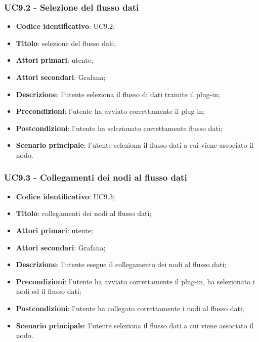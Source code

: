 \subsubsection{UC9.2 - Selezione del flusso dati}
\begin{itemize}
	\item \textbf{Codice identificativo}: UC9.2;
	\item \textbf{Titolo}: selezione del flusso dati;
	\item \textbf{Attori primari}: utente;
	\item \textbf{Attori secondari}: Grafana\glo;
	\item \textbf{Descrizione}: l'utente seleziona il flusso di dati tramite il plug-in;
	\item \textbf{Precondizioni}: l'utente ha avviato correttamente il plug-in;
	\item \textbf{Postcondizioni}: l'utente ha selezionato correttamente flusso dati;
	\item \textbf{Scenario principale}: l'utente seleziona il flusso dati a cui viene associato il nodo.
\end{itemize}

\subsubsection{UC9.3 - Collegamenti dei nodi al flusso dati}
\begin{itemize}
	\item \textbf{Codice identificativo}: UC9.3;
	\item \textbf{Titolo}: collegamenti dei nodi al flusso dati;
	\item \textbf{Attori primari}: utente;
	\item \textbf{Attori secondari}: Grafana\glo;
	\item \textbf{Descrizione}: l'utente esegue il collegamento dei nodi al flusso dati;
	\item \textbf{Precondizioni}: l'utente ha avviato correttamente il plug-in, ha selezionato i nodi ed il flusso dati;
	\item \textbf{Postcondizioni}: l'utente ha collegato correttamente i nodi al flusso dati;
	\item \textbf{Scenario principale}: l'utente seleziona il flusso dati a cui viene associato il nodo.
\end{itemize}

